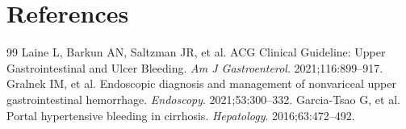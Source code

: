 \section*{References}
\begin{thebibliography}{99}
 Laine L, Barkun AN, Saltzman JR, et al. ACG Clinical Guideline: Upper Gastrointestinal and Ulcer Bleeding. \textit{Am J Gastroenterol}. 2021;116:899--917.
 Gralnek IM, et al. Endoscopic diagnosis and management of nonvariceal upper gastrointestinal hemorrhage. \textit{Endoscopy}. 2021;53:300--332.
 Garcia-Tsao G, et al. Portal hypertensive bleeding in cirrhosis. \textit{Hepatology}. 2016;63:472--492.
\end{thebibliography}
